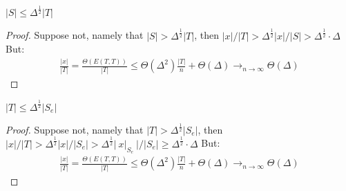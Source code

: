 \begin{claim}
  $ |S| \le \Delta^{\frac{1}{2}}|T| $ 
\end{claim}
\begin{proof}
Suppose not, namely that $|S| > \Delta^{\frac{1}{2}}|T|$, then $|x|/|T| > \Delta^{\frac{1}{2}}|x|/|S| > \Delta^{\frac{1}{2}} \cdot \Delta $ But:  
\begin{equation*}
  \begin{split}
    \frac{|x|}{|T|} = \frac{\Theta \left(E(T,T) \right)}{|T|} \le \Theta(\Delta^{2})\frac{|T|}{n}  + \Theta(\Delta)  \rightarrow_{n\rightarrow \infty} \Theta(\Delta)
  \end{split}
\end{equation*}
\end{proof}

\begin{claim} 
  $ |T| \le \Delta^{\frac{1}{2}}|S_{e}| $ 
\end{claim}
\begin{proof}
  Suppose not, namely that $|T| > \Delta^{\frac{1}{2}}|S_{e}|$, then $|x|/|T| > \Delta^{\frac{1}{2}}|x|/|S_{e}| > \Delta^{\frac{1}{2}}| \  x|_{S_{e}} \ |/|S_{e}| \ge \Delta^{\frac{1}{2}} \cdot \Delta $ But:  
\begin{equation*}
  \begin{split}
    \frac{|x|}{|T|} = \frac{\Theta \left(E(T,T) \right)}{|T|} \le \Theta(\Delta^{2})\frac{|T|}{n}  + \Theta(\Delta)  \rightarrow_{n\rightarrow \infty} \Theta(\Delta)
  \end{split}
\end{equation*}

\end{proof}


